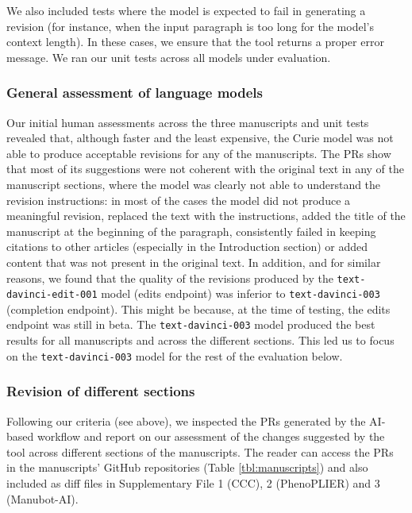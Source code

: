 \documentclass[
]{article}
\begin{document}
We also included tests where the model is expected to fail in generating a revision (for instance, when the input paragraph is too long for the model's context length).
In these cases, we ensure that the tool returns a proper error message.
We ran our unit tests across all models under evaluation.

\hypertarget{general-assessment-of-language-models}{%
\subsubsection{General assessment of language models}\label{general-assessment-of-language-models}}

Our initial human assessments across the three manuscripts and unit tests revealed that, although faster and the least expensive, the Curie model was not able to produce acceptable revisions for any of the manuscripts.
The PRs show that most of its suggestions were not coherent with the original text in any of the manuscript sections, where the model was clearly not able to understand the revision instructions: in most of the cases the model did not produce a meaningful revision, replaced the text with the instructions, added the title of the manuscript at the beginning of the paragraph, consistently failed in keeping citations to other articles (especially in the Introduction section) or added content that was not present in the original text.
In addition, and for similar reasons, we found that the quality of the revisions produced by the \texttt{text-davinci-edit-001} model (edits endpoint) was inferior to \texttt{text-davinci-003} (completion endpoint).
This might be because, at the time of testing, the edits endpoint was still in beta.
The \texttt{text-davinci-003} model produced the best results for all manuscripts and across the different sections.
This led us to focus on the \texttt{text-davinci-003} model for the rest of the evaluation below.

\hypertarget{revision-of-different-sections}{%
\subsubsection{Revision of different sections}\label{revision-of-different-sections}}

Following our criteria (see above), we inspected the PRs generated by the AI-based workflow and report on our assessment of the changes suggested by the tool across different sections of the manuscripts.
The reader can access the PRs in the manuscripts' GitHub repositories (Table \ref{tbl:manuscripts}) and also included as diff files in Supplementary File 1 (CCC), 2 (PhenoPLIER) and 3 (Manubot-AI).
\end{document}

